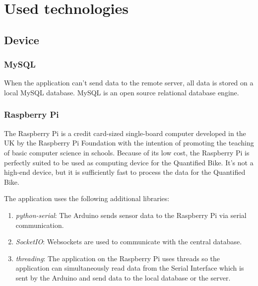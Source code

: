 \section{Used technologies}
\subsection{Device}
\subsubsection{MySQL}
When the application can't send data to the remote server, all data is stored on a local MySQL database. MySQL is an open source relational database engine.

\subsubsection{Raspberry Pi}
The Raspberry Pi is a credit card-sized single-board computer developed in the UK by the Raspberry Pi Foundation with the intention of promoting the teaching of basic computer science in schools.\cite{RaspberryWikipedia}
Because of its low cost, the Raspberry Pi is perfectly suited to be used as computing device for the Quantified Bike. 
It's not a high-end device, but it is sufficiently fast to process the data for the Quantified Bike.

The application uses the following additional libraries:
\begin{enumerate}
 \item \textit{python-serial}: The Arduino sends sensor data to the Raspberry Pi via serial communication.
 \item \textit{SocketIO}: Websockets are used to communicate with the central database.
 \item \textit{threading}: The application on the Raspberry Pi uses threads so the application can simultaneously read data from the Serial Interface which is sent by the Arduino and send data to the local database or the server.
\end{enumerate}

